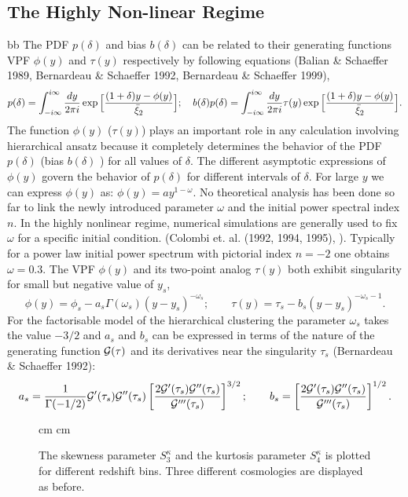 \documentclass[usenatbib]{mn2e}
\def\be{\begin{equation}}
\def\ee{\end{equation}}
\def\be{\begin{equation}}
\def\ee{\end{equation}}
\begin{document}
\subsection {The Highly Non-linear Regime}
\label{subsec:non}bb
%
The PDF $p(\delta)$ and bias $b(\delta)$  can be related to their
generating functions VPF $\phi(y)$ and $\tau(y)$ respectively
by following equations (Balian \& Schaeffer 1989, Bernardeau \&
Schaeffer 1992, Bernardeau \& Schaeffer 1999),
%
\be
p(\delta) = \int_{-i\infty}^{i\infty} { dy \over 2 \pi i} \exp \Big [ {(
1 + \delta )y - \phi(y)  \over \bar \xi_2} \Big ]; \quad
b(\delta) p(\delta) = \int_{-i\infty}^{i\infty} { dy \over 2 \pi i} \tau(y) \exp \Big [ {(
1 + \delta )y - \phi(y)  \over \bar \xi_2} \Big ] \label{ber}. 
\ee
%
The function $\phi(y)$ ($\tau(y)$) plays an important role in any calculation involving hierarchical
ansatz because it completely determines 
the behavior of the PDF $p(\delta)$ (bias $b(\delta)$ ) for all values of $\delta$. The
different asymptotic expressions of $\phi(y)$ govern the behavior
of $p(\delta)$ for different intervals of $\delta$. For large $y$ we
can express $\phi(y)$ as: $\phi(y) = a y^{ 1 - \omega}$.
No theoretical analysis has been done so far to link the newly introduced parameter $\omega$ and the initial power spectral index $n$. In the highly nonlinear regime, numerical simulations are generally
used to fix $\omega$ for a specific initial condition. 
(Colombi et. al. (1992, 1994, 1995), \cite{MuBaMeSch99}). Typically for a power law initial power spectrum 
with pictorial index $n=-2$ one obtains $\omega=0.3$. The VPF
$\phi(y)$ and its two-point analog $\tau(y)$
both exhibit singularity for small but negative value of $y_s$,
%
\be
\phi(y) = \phi_s - a_s \Gamma(\omega_s) ( y - y_s)^{-\omega_s}; \quad\quad
\tau(y) = \tau_s - b_s ( y - y_s )^{-\omega_s - 1}.
\ee
%
For the factorisable model of the hierarchical clustering the 
parameter $\omega_s$
takes the value $-3/2$ and $a_s$ and $b_s$ can be expressed in terms
of the  nature of the generating function ${\cal G}(\tau)$ and its 
derivatives near the singularity $\tau_s$ 
(Bernardeau \& Schaeffer 1992):
%
\be
a_s = {1 \over \Gamma(-1/2)}{\cal G}'(\tau_s) {\cal G}''(\tau_s) \left [
{ 2 {\cal G}'(\tau_s) {\cal G}''(\tau_s) \over {\cal G}'''(\tau_s)}
\right ]^{3/2}; \quad\quad
b_s = \left [
{ 2 {\cal G}'(\tau_s) {\cal G}''(\tau_s) \over {\cal G}'''(\tau_s)}
\right ]^{1/2}.
\ee
%
\begin{figure}
\begin{center}
{ cm  cm
{}}
\end{center}
\caption{The skewness parameter $S^{\kappa}_3$ and the kurtosis parameter $S^{\kappa}_4$ is plotted for different redshift bins.
Three different cosmologies are displayed as before.}
\label{fig:sn}
\end{figure}
\end{document}
